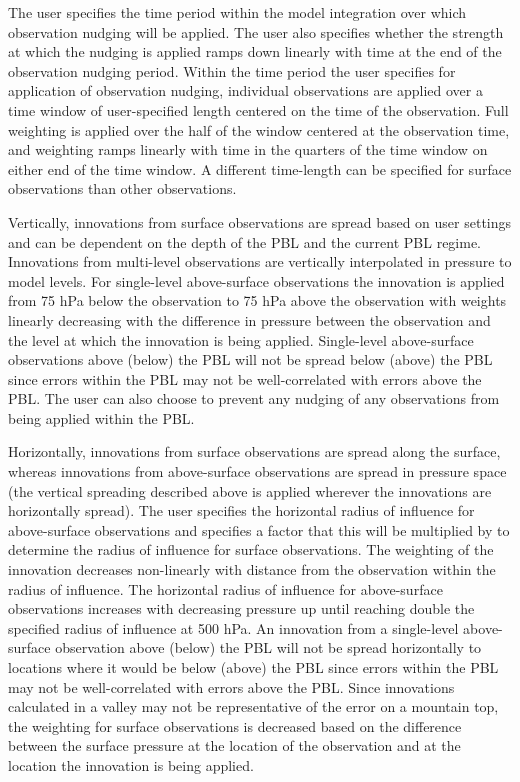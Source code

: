 The user specifies the time period within the model integration over which observation nudging will be applied.  The user also specifies whether the strength at which the nudging is applied ramps down linearly with time at the end of the observation nudging period.  Within the time period the user specifies for application of observation nudging, individual observations are applied over a time window of user-specified length centered on the time of the observation.  Full weighting is applied over the half of the window centered at the observation time, and weighting ramps linearly with time in the quarters of the time window on either end of the time window.  A different time-length can be specified for surface observations than other observations.

Vertically, innovations from surface observations are spread based on user settings and can be dependent on the depth of the PBL and the current PBL regime.  Innovations from multi-level observations are vertically interpolated in pressure to model levels.  For single-level above-surface observations the innovation is applied from 75 hPa below the observation to 75 hPa above the observation with weights linearly decreasing with the difference in pressure between the observation and the level at which the innovation is being applied.  Single-level above-surface observations above (below) the PBL will not be spread below (above) the PBL since errors within the PBL may not be well-correlated with errors above the PBL.  The user can also choose to prevent any nudging of any observations from being applied within the PBL.

Horizontally, innovations from surface observations are spread along the surface, whereas innovations from above-surface observations are spread in pressure space (the vertical spreading described above is applied wherever the innovations are horizontally spread). The user specifies the horizontal radius of influence for above-surface observations and specifies a factor that this will be multiplied by to determine the radius of influence for surface observations.  The weighting of the innovation decreases non-linearly with distance from the observation within the radius of influence. The horizontal radius of influence for above-surface observations increases with decreasing pressure up until reaching double the specified radius of influence at 500 hPa.   An innovation from a single-level above-surface observation above (below) the PBL will not be spread horizontally to locations where it would be below (above) the PBL since errors within the PBL may not be well-correlated with errors above the PBL.  Since innovations calculated in a valley may not be representative of the error on a mountain top, the weighting for surface observations is decreased based on the difference between the surface pressure at the location of the observation and at the location the innovation is being applied.

